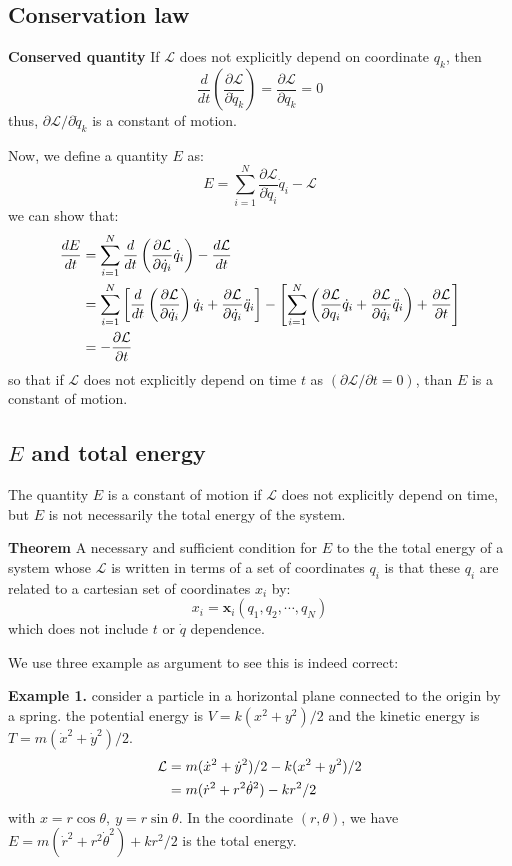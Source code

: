 \documentclass{article}
\newcommand{\pfrac}[2]{\frac{\partial #1}{\partial #2}}
\newcommand{\ddt}[1]{\frac{d}{dt}\left( #1 \right)}
\renewcommand{\L}{\mathcal{L}}
\newcommand{\dotx}{\dot{x}}
\newcommand{\dotq}{\dot{q}}
\begin{document}
\subsection{Conservation law}
\textbf{Conserved quantity}
If $\L$ does not explicitly depend on coordinate $q_k$, then
\begin{equation}
    \ddt{\pfrac{ \L}{\dotq_k}} = \pfrac{\L}{q_k} = 0
\end{equation}
thus, $\partial \L / \partial \dotq_k $ is a constant of motion.

Now, we define a quantity $E$ as:
\begin{equation}
    E = \sum_{i=1}^N \pfrac{\L}{\dotq_i} \dotq_i - \L
\end{equation}
we can show that:
\begin{align}
    \frac{dE}{dt} &= \sum_{i=1}^N \ddt{\pfrac{\L}{\dotq_i} \dotq_i} - \frac{d\L}{dt} \notag \\
    &= \sum_{i=1}^N \left[ \ddt{\pfrac{\L}{\dotq_i}}\dotq_i + \pfrac{\L}{\dotq_i}\ddot{q}_i \right]
    - \left[ \sum_{i=1}^N\left( \pfrac{\L}{q_i}\dotq_i + \pfrac{\L}{\dotq_i}\ddot{q}_i \right) + \pfrac{\L}{t}\right] \notag \\
    &= - \pfrac{\L}{t}
\end{align}
so that if $\L$ does not explicitly depend on time $t$ as $(\partial \L / \partial t = 0)$, than $E$ is a constant of motion.

\subsection{$E$ and total energy}
The quantity $E$ is a constant of motion if $\L$ does not explicitly depend on time, but $E$ is not 
necessarily the total energy of the system.

\textbf{Theorem} A necessary and sufficient condition for $E$ to the the 
total energy of a system whose $\L$ is written in terms of a set of coordinates
$q_i$ is that these $q_i$ are related to a cartesian set of coordinates $x_i$ by:
\begin{equation}
    x_i = \mathbf{x}_i (q_1, q_2, \cdots, q_N)
\end{equation}
which does not include $t$ or $\dotq$ dependence.

We use three example as argument to see this is indeed correct:

\textbf{Example 1.} 
consider a particle in a horizontal plane connected to the origin by a spring. the potential 
energy is $V = k(x^2+y^2) / 2$ and the kinetic energy is $T = m(\dotx^2 + \dot{y}^2)/2$. 
\begin{align}
    \L &= m(\dotx^2 + \dot{y}^2)/2 - k(x^2+y^2) / 2 \notag \\
     &= m(\dot{r}^2 + r^2\dot{\theta}^2) - kr^2/2 \notag
\end{align}
with $x = r\cos\theta,\ y = r\sin\theta$. 
In the coordinate $(r,\theta)$, we have $E = m(\dot{r}^2 + r^2\dot{\theta}^2) + kr^2/2$ is the total energy.
\end{document}
